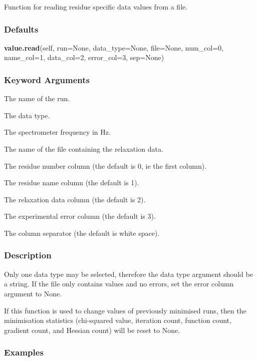 Function for reading residue specific data values from a file.

\subsubsection{Defaults}

\textsf{\textbf{value.read}(self, run=None, data\_type=None, file=None, num\_col=0, name\_col=1, data\_col=2, error\_col=3, sep=None)}


\subsubsection{Keyword Arguments}


  The name of the run.

  The data type.

  The spectrometer frequency in Hz.

  The name of the file containing the relaxation data.

  The residue number column (the default is 0, ie the first column).

  The residue name column (the default is 1).

  The relaxation data column (the default is 2).

  The experimental error column (the default is 3).

  The column separator (the default is white space).

\subsubsection{Description}

Only one data type may be selected, therefore the data type argument should be a string.  If
the file only contains values and no errors, set the error column argument to None.

If this function is used to change values of previously minimised runs, then the
minimisation statistics (chi-squared value, iteration count, function count, gradient count,
and Hessian count) will be reset to None.


\subsubsection{Examples}

